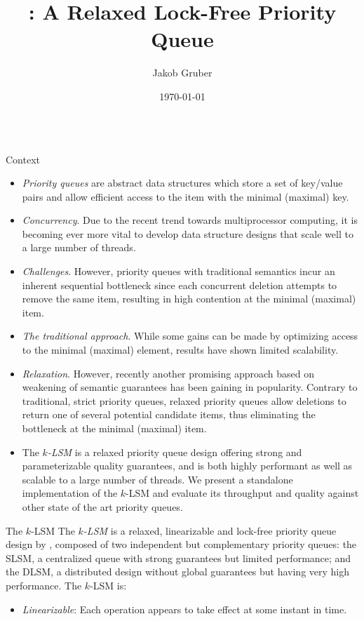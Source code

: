 \documentclass[final,hyperref={pdfpagelabels=true}]{beamer}
\title[Software Engineering \& Internet Computing]{
  \klsm: A Relaxed Lock-Free Priority Queue
}
\author[gruber@par.tuwien.ac.at]{Jakob Gruber}
\institute[]{%
  Technische Universit{\"a}t Wien\\[0.25\baselineskip]
  Institut f{\"u}r Informationssysteme\\[0.25\baselineskip]
  Arbeitsbereich: Parallel Computing\\[0.25\baselineskip]
  Betreuer: Prof. Dr. Scient. Jesper Larsson Tr\"aff
}
\date[\today]{\today}
\newcommand{\klsm}{$k$-LSM\xspace}
\begin{document}
\begin{frame}
\begin{columns}[t]
\begin{column}{.45\textwidth}
\begin{block}{Context}
\begin{itemize}
\justifying
\item \emph{Priority queues} are abstract data structures which store a set of key/value pairs
and allow efficient access to the item with the minimal (maximal) key.

\item \emph{Concurrency}. Due to the recent trend towards multiprocessor computing, it is becoming ever
more vital to develop data structure designs that scale well to a large number
of threads.

\item \emph{Challenges}.
However, priority queues with traditional semantics incur an inherent sequential
bottleneck since each concurrent deletion attempts to remove the same item,
resulting in high contention at the minimal (maximal) item.

\item \emph{The traditional approach}. While some gains can be made by optimizing access to the minimal (maximal)
element, results have shown limited scalability.

\item \emph{Relaxation}. However, recently another promising approach based on weakening of
semantic guarantees has been gaining in popularity. Contrary to traditional,
strict priority queues, relaxed priority queues allow deletions to
return one of several potential candidate items, thus eliminating the
bottleneck at the minimal (maximal) item.

\item The \emph{\klsm} is a relaxed priority queue design offering strong and
parameterizable quality guarantees, and is both highly performant as well
as scalable to a large number of threads. We present a standalone implementation
of the \klsm and evaluate its throughput and quality against other state of the art
priority queues.
\end{itemize}
\end{block}

\begin{block}{The \klsm}
\justifying
The \emph{\klsm} is a relaxed, linearizable and lock-free priority queue design by
\citeauthor{wimmer2015lock} \cite{wimmer2015lock}, composed of two independent but
complementary priority queues: the \ac{SLSM}, a centralized queue with strong
guarantees but limited performance; and the \ac{DLSM}, a distributed design without
global guarantees but having very high performance. The \klsm is:
\begin{itemize}
\justifying
\item \emph{Linearizable}: Each operation appears to take effect at some instant
in time.


\end{itemize}
\end{block}
\end{column}
\end{columns}
\end{frame}
\end{document}
